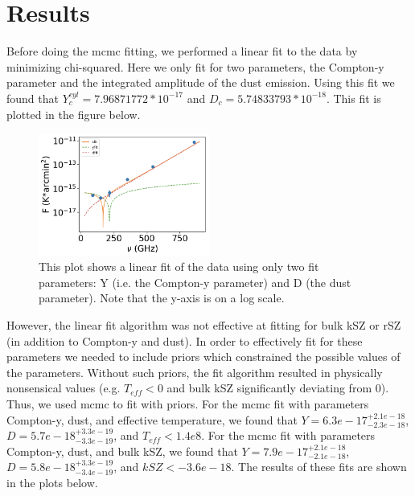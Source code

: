 \documentclass{princeton_astro_thesis}
\begin{document}
\chapter{Results}
Before doing the mcmc fitting, we performed a linear fit to the data by minimizing chi-squared. Here we only fit for two parameters, the Compton-y parameter and the integrated amplitude of the dust emission. Using this fit we found that $Y^{cyl}_{c}=7.96871772*10^{-17}$ and $D_c=5.74833793*10^{-18}$. This fit is plotted in the figure below.

\begin{figure}[h]
\centering
\includegraphics[width=0.5\textwidth]{../redmapper_apfluxes_fitlog_earlier_version.png}
\caption{This plot shows a linear fit of the data using only two fit parameters: Y (i.e. the Compton-y parameter) and D (the dust parameter). Note that the y-axis is on a log scale.}
\end{figure}

\par However, the linear fit algorithm was not effective at fitting for bulk kSZ or rSZ (in addition to Compton-y and dust). In order to effectively fit for these parameters we needed to include priors which constrained the possible values of the parameters. Without such priors, the fit algorithm resulted in physically nonsensical values (e.g. $T_{eff}<0$ and bulk kSZ significantly deviating from 0). Thus, we used mcmc to fit with priors. For the mcmc fit with parameters Compton-y, dust, and effective temperature, we found that $Y=6.3e-17^{+2.1e-18}_{-2.3e-18}$, $D=5.7e-18^{+3.3e-19}_{-3.3e-19}$, and $T_{eff}<1.4e8$. For the mcmc fit with parameters Compton-y, dust, and bulk kSZ, we found that $Y=7.9e-17^{+2.1e-18}_{-2.1e-18}$, $D=5.8e-18^{+3.3e-19}_{-3.4e-19}$, and $kSZ<-3.6e-18$. The results of these fits are shown in the plots below. 
\end{document}
